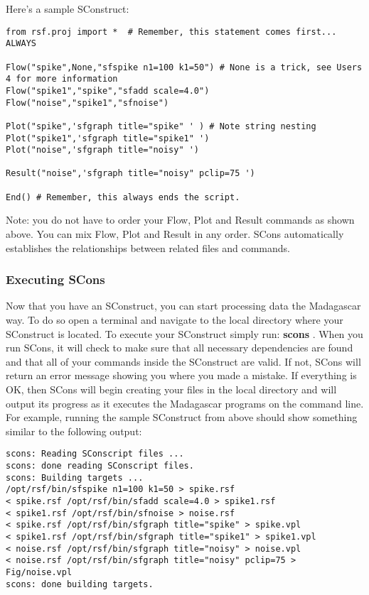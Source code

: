 Here's a sample SConstruct:
\begin{verbatim}
from rsf.proj import *  # Remember, this statement comes first... ALWAYS

Flow("spike",None,"sfspike n1=100 k1=50") # None is a trick, see Users 4 for more information
Flow("spike1","spike","sfadd scale=4.0")
Flow("noise","spike1","sfnoise")

Plot("spike",'sfgraph title="spike" ' ) # Note string nesting
Plot("spike1",'sfgraph title="spike1" ') 
Plot("noise",'sfgraph title="noisy" ')

Result("noise",'sfgraph title="noisy" pclip=75 ')

End() # Remember, this always ends the script.
\end{verbatim}
Note: you do not have to order your Flow, Plot and Result commands as shown above.  You can mix Flow, Plot and Result in any order.  SCons automatically establishes the relationships between related files and commands.

\subsubsection{Executing SCons}

Now that you have an SConstruct, you can start processing data the Madagascar way.  To do so open a terminal and navigate to the local directory where your SConstruct is located.  To execute your SConstruct simply run: \textbf{scons} .  When you run SCons, it will check to make sure that all necessary dependencies are found and that all of your commands inside the SConstruct are valid.  If not, SCons will return an error message showing you where you made a mistake.  If everything is OK, then SCons will begin creating your files in the local directory and will output its progress as it executes the Madagascar programs on the command line.  For example, running the sample SConstruct from above should show something similar to the following output:

\begin{verbatim}
scons: Reading SConscript files ...
scons: done reading SConscript files.
scons: Building targets ...
/opt/rsf/bin/sfspike n1=100 k1=50 > spike.rsf
< spike.rsf /opt/rsf/bin/sfadd scale=4.0 > spike1.rsf
< spike1.rsf /opt/rsf/bin/sfnoise > noise.rsf
< spike.rsf /opt/rsf/bin/sfgraph title="spike" > spike.vpl
< spike1.rsf /opt/rsf/bin/sfgraph title="spike1" > spike1.vpl
< noise.rsf /opt/rsf/bin/sfgraph title="noisy" > noise.vpl
< noise.rsf /opt/rsf/bin/sfgraph title="noisy" pclip=75 > Fig/noise.vpl
scons: done building targets.
\end{verbatim}

